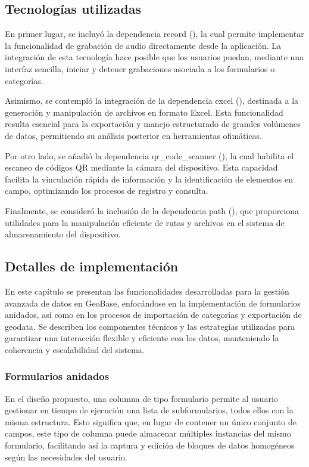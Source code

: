 \documentclass{article}
\begin{document}
\subsection{Tecnologías utilizadas}

En primer lugar, se incluyó la dependencia record (\cite{record2024}), la cual permite implementar la funcionalidad de grabación de audio directamente desde la aplicación. La integración de esta tecnología hace posible que los usuarios puedan, mediante una interfaz sencilla, iniciar y detener grabaciones asociada a los formularios o categorías.

Asimismo, se contempló la integración de la dependencia excel (\cite{excel2024}), destinada a la generación y manipulación de archivos en formato Excel. Esta funcionalidad resulta esencial para la exportación y manejo estructurado de grandes volúmenes de datos, permitiendo su análisis posterior en herramientas ofimáticas. 

Por otro lado, se añadió la dependencia qr\_code\_scanner (\cite{qrcodescanner2024}), la cual habilita el escaneo de códigos QR mediante la cámara del dispositivo. Esta capacidad facilita la vinculación rápida de información y la identificación de elementos en campo, optimizando los procesos de registro y consulta.

Finalmente, se consideró la inclusión de la dependencia path (\cite{path2024}), que proporciona utilidades para la manipulación eficiente de rutas y archivos en el sistema de almacenamiento del dispositivo.


\subsection{Detalles de implementación}

En este capítulo se presentan las funcionalidades desarrolladas para la gestión avanzada de datos en GeoBase, enfocándose en la implementación de formularios anidados, así como en los procesos de importación de categorías y exportación de geodata. Se describen los componentes técnicos y las estrategias utilizadas para garantizar una interacción flexible y eficiente con los datos, manteniendo la coherencia y escalabilidad del sistema.

\subsubsection{Formularios anidados}

En el diseño propuesto, una columna de tipo formulario permite al usuario gestionar en tiempo de ejecución una lista de subformularios, todos ellos con la misma estructura. Esto significa que, en lugar de contener un único conjunto de campos, este tipo de columna puede almacenar múltiples instancias del mismo formulario, facilitando así la captura y edición de bloques de datos homogéneos según las necesidades del usuario.
\end{document}
